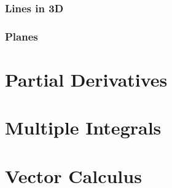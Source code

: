\documentclass{package/notes}
\begin{document}
\subsection{Lines in 3D}

\subsection{Planes}




\chapter{Partial Derivatives}



\chapter{Multiple Integrals}



\chapter{Vector Calculus}
\end{document}

